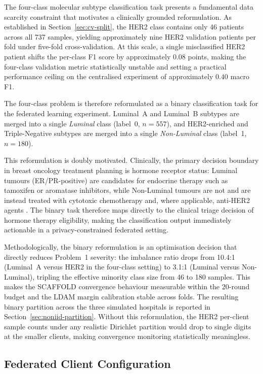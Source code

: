The four-class molecular subtype classification task
presents a fundamental data scarcity constraint that
motivates a clinically grounded reformulation.
As established in Section~\ref{sec:cv-split}, the HER2
class contains only 46 patients across all 737 samples,
yielding approximately nine HER2 validation patients per
fold under five-fold cross-validation.
At this scale, a single misclassified HER2 patient shifts
the per-class F1 score by approximately 0.08 points,
making the four-class validation metric statistically
unstable and setting a practical performance ceiling on
the centralised experiment of approximately $0.40$ macro F1.

The four-class problem is therefore reformulated as a
binary classification task for the federated learning
experiment.
Luminal~A and Luminal~B subtypes are merged into a single
\emph{Luminal} class (label~0, $n=557$), and HER2-enriched
and Triple-Negative subtypes are merged into a single
\emph{Non-Luminal} class (label~1, $n=180$).

This reformulation is doubly motivated.
Clinically, the primary decision boundary in breast
oncology treatment planning is hormone receptor status:
Luminal tumours (ER/PR-positive) are candidates for
endocrine therapy such as tamoxifen or aromatase
inhibitors, while Non-Luminal tumours are not and are
instead treated with cytotoxic chemotherapy and, where
applicable, anti-HER2 agents \cite{alves2023breastmri}.
The binary task therefore maps directly to the clinical
triage decision of hormone therapy eligibility, making
the classification output immediately actionable in a
privacy-constrained federated setting.

Methodologically, the binary reformulation is an
optimisation decision that directly reduces Problem~1
severity: the imbalance ratio drops from 10.4:1
(Luminal~A versus HER2 in the four-class setting) to
3.1:1 (Luminal versus Non-Luminal), tripling the
effective minority class size from 46 to 180 samples.
This makes the SCAFFOLD convergence behaviour
measurable within the 20-round budget and the LDAM
margin calibration stable across folds.
The resulting binary partition across the three
simulated hospitals is reported in
Section~\ref{sec:noniid-partition}.
Without this reformulation, the HER2 per-client sample
counts under any realistic Dirichlet partition would drop to
single digits at the smaller clients, making convergence
monitoring statistically meaningless.


\subsection{Federated Client Configuration}
\label{sec:fl-clients}

